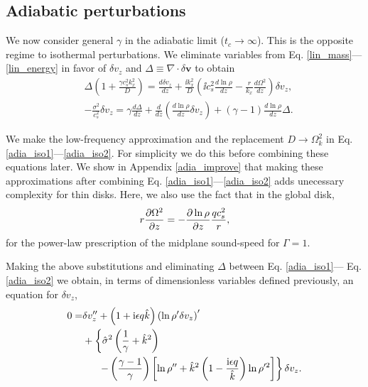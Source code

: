 \subsection{Adiabatic perturbations}\label{analytic_adia}
We now consider general $\gamma$ in the
adiabatic limit ($t_c\to\infty$). This is the opposite regime to
isothermal perturbations. We eliminate variables from 
Eq. \ref{lin_mass}---\ref{lin_energy} in favor of $\delta v_z$ 
and $\Delta \equiv \nabla\cdot\delta\bm{v}$ to obtain
\begin{align}
  &\Delta\left(1 + \frac{\gamma c_s^2 k_x^2}{D}\right) = \frac{d\delta
    v_z}{dz} + \frac{\ii k_x^2}{D}\left(\ii c_s^2 \frac{d\ln\rho}{dz}
    - \frac{r}{k_x}\frac{d\Omega^2}{dz}\right)\delta v_z,\label{adia_iso1}\\
  & -\frac{\sigma^2}{c_s^2}\delta v_z = \gamma \frac{d\Delta}{dz} +
  \frac{d}{dz}\left(\frac{d\ln\rho}{dz}\delta v_z\right) +
  \left(\gamma-1\right)\frac{d\ln\rho}{dz} \Delta.\label{adia_iso2}
\end{align}

We make the low-frequency approximation and the replacement 
$D\to \Omega_k^2$ in Eq. \ref{adia_iso1}---\ref{adia_iso2}. For
simplicity we do this before combining these equations later. We  
show in Appendix \ref{adia_improve} that making these approximations
after combining  Eq. \ref{adia_iso1}---\ref{adia_iso2} adds unecessary
complexity for thin disks. Here, we also use the fact that in the
global disk, 
\begin{align}
  r\frac{\partial \Omega^2}{\partial z} = -\frac{\partial \ln\rho}{\partial z} \frac{qc_s^2}{r},
\end{align}
for the power-law prescription of the midplane sound-speed for
$\Gamma=1$.  

Making the above substitutions and eliminating $\Delta$ between Eq. \ref{adia_iso1}---
Eq. \ref{adia_iso2} we obtain, in terms of dimensionless variables defined
previously, an equation for $\delta v_z$, 
\begin{align}
  0 =& \delta v_z^{\prime\prime} + \left(1 + \mathrm{i} \epsilon q
    \hat{k}\right)\left(\ln\rho^{\prime}\delta v_z\right)^\prime\notag\\
  &+\left\{\hat{\sigma}^2\left(\frac{1}{\gamma}+\hat{k}^2\right)\right.\notag\\
  &\phantom{0=}\left.-\left(\frac{\gamma-1}{\gamma}\right)\left[\ln\rho^{\prime\prime}+\hat{k}^2\left(1-\frac{\mathrm{i}\epsilon  
          q}{\hat{k}}\right)\ln\rho^{\prime 2}\right]\right\}\delta v_z.\label{adia_iso3}
\end{align}

